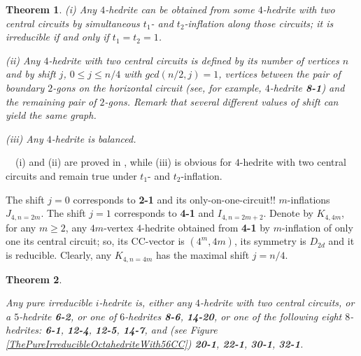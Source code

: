\documentclass[12pt]{article}
\newtheorem{theorem}{Theorem}
\newcommand{\proof}{\noindent{\bf Proof.}\ \ }
\begin{document}
\begin{theorem}\label{Theorem-for-4-hedrite}
(i) Any $4$-hedrite can be obtained from some $4$-hedrite with two central
circuits by simultaneous $t_1$- and $t_2$-inflation along those circuits; it is
irreducible if and only if $t_1=t_2=1$.

(ii) Any $4$-hedrite with two central circuits is defined by
its number of vertices $n$ and by {\em shift} $j$, $0 \le j \le n/4$
with $gcd(n/2, j)=1$,
vertices between the pair of boundary $2$-gons on the horizontal
circuit (see, for example, $4$-hedrite {\bf 8-1}) and the remaining
pair of $2$-gons. Remark that several different values of shift can yield
the same graph.

(iii) Any $4$-hedrite is balanced.

\end{theorem}
\proof (i) and (ii) are proved in \cite{DSt}, 
while (iii) is obvious for $4$-hedrite with two central circuits
and remain true under $t_1$- and $t_2$-inflation.

The shift $j=0$ corresponds to {\bf 2-1} and its only-on-one-circuit!!
$m$-inflations $J_{4,n=2m}$. The shift $j=1$ corresponds to {\bf 4-1} and 
$I_{4,n=2m+2}$.
Denote by $K_{4,4m}$, for any $m \ge 2$, any $4m$-vertex $4$-hedrite obtained
from {\bf 4-1} by $m$-inflation of only one its central circuit; so, its 
CC-vector is $(4^m,4m)$, its symmetry is $D_{2d}$ and it is reducible.
Clearly, any $K_{4,n=4m}$ has the maximal shift $j=n/4$.




%










\begin{theorem}\label{TheOneWithSimpleCentralCircuit}

Any pure irreducible $i$-hedrite is, either any $4$-hedrite with two
central circuits, or a $5$-hedrite {\bf 6-2}, or one of $6$-hedrites
{\bf 8-6}, {\bf 14-20}, or one of the following eight $8$-hedrites:
{\bf 6-1}, {\bf 12-4}, {\bf 12-5}, {\bf 14-7}, and (see Figure 
\ref{ThePureIrreducibleOctahedriteWith56CC}) {\bf 20-1}, {\bf 22-1},
{\bf 30-1}, {\bf 32-1}.


\end{theorem}
\end{document}
